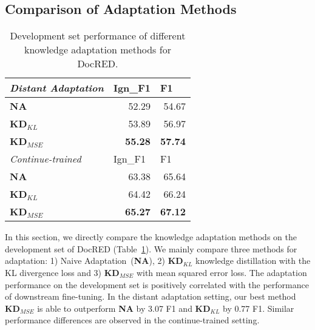 \documentclass[11pt]{article}
\begin{document}
\subsection{Comparison of Adaptation Methods}
\label{sec:compare-adaptation}



\begin{table}[ht]
\centering

\begin{tabular}{lrr} 
\hline
\textit{Distant Adaptation} & \multicolumn{1}{l}{Ign\_F1} & \multicolumn{1}{l}{F1}  \\ 
\hline
\textbf{NA}                 & 52.29                       & 54.67                             \\            
\textbf{KD$_{KL}$}             & 53.89                       & 56.97                             \\
\textbf{KD$_{MSE}$}            & \textbf{55.28}                       & \textbf{57.74}                             \\
\hline
\textit{Continue-trained} & \multicolumn{1}{l}{Ign\_F1} & \multicolumn{1}{l}{F1}  \\ 
\hline
\textbf{NA}                 & 63.38                       & 65.64                              \\            
\textbf{KD$_{KL}$}             & 64.42                       & 66.24                             \\
\textbf{KD$_{MSE}$}            & \textbf{65.27}                       & \textbf{67.12}                             \\
\hline
\end{tabular}
\setlength{\abovecaptionskip}{0pt}
\caption{Development set performance of different knowledge adaptation methods for DocRED.}
\label{tab:distant-results}
\end{table}


In this section, we directly compare the knowledge adaptation methods on the development set of DocRED (Table~\ref{tab:distant-results}). We mainly compare three methods for adaptation: 1) Naive Adaptation~(\textbf{NA}), 2) \textbf{KD$_{KL}$} knowledge distillation with the KL divergence loss and 3) \textbf{KD$_{MSE}$} with mean squared error loss. The adaptation performance on the development set is positively correlated with the performance of downstream fine-tuning. In the distant adaptation setting, our best method \textbf{KD$_{MSE}$} is able to outperform \textbf{NA} by 3.07 F1 and \textbf{KD$_{KL}$} by 0.77 F1. Similar performance differences are observed in the continue-trained setting.
\end{document}
